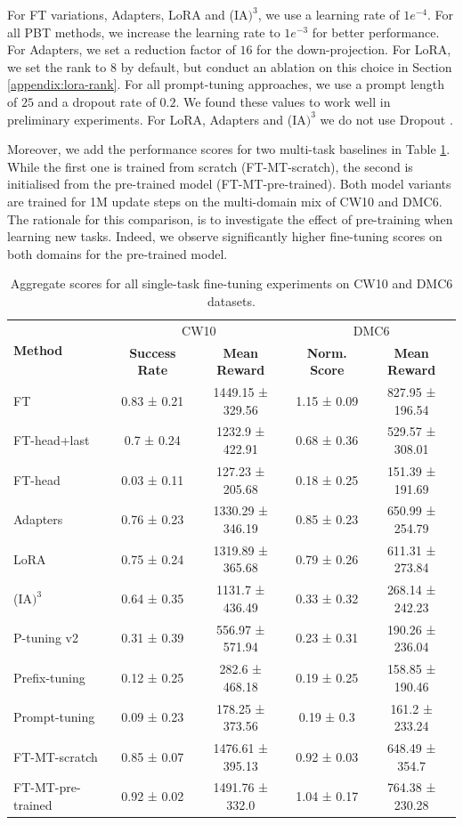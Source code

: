 For FT variations, Adapters, LoRA and (IA$\text{)}^3$, we use a learning rate of $1e^{-4}$. For all PBT methods, we increase the learning rate to $1e^{-3}$ for better performance. For Adapters, we set a reduction factor of $16$ for the down-projection. For LoRA, we set the rank to 8 by default, but conduct an ablation on this choice in Section \ref{appendix:lora-rank}. For all prompt-tuning approaches, we use a prompt length of $25$ and a dropout rate of $0.2$. We found these values to work well in preliminary experiments. For LoRA, Adapters and (IA$\text{)}^3$ we do not use Dropout \citep{Srivastava:14}. 

Moreover, we add the performance scores for two multi-task baselines in Table \ref{tab:appendix-adapt-full}. While the first one is trained from scratch (FT-MT-scratch), the second is initialised from the pre-trained model (FT-MT-pre-trained). Both model variants are trained for 1M update steps on the multi-domain mix of CW10 and DMC6. The rationale for this comparison, is to investigate the effect of pre-training when learning new tasks. Indeed, we observe significantly higher fine-tuning scores on both domains for the pre-trained model.  

\begin{table}[]
    \centering
    \caption{Aggregate scores for all single-task fine-tuning experiments on CW10 and DMC6 datasets.}
    \begin{tabular}{l c c | c c}
    \toprule
    \multirow{2}{*}{\textbf{Method}} & \multicolumn{2}{c}{CW10} & \multicolumn{2}{c}{DMC6} \\
    &  \textbf{Success Rate} &  \textbf{Mean Reward} & \textbf{Norm. Score} & \textbf{Mean Reward} \\
    \midrule
    FT &  0.83 ± 0.21 & 1449.15 ± 329.56 & 1.15 ± 0.09 & 827.95 ± 196.54 \\
    FT-head+last &   0.7 ± 0.24 &  1232.9 ± 422.91 & 0.68 ± 0.36 & 529.57 ± 308.01 \\
    FT-head &  0.03 ± 0.11 &  127.23 ± 205.68 & 0.18 ± 0.25 & 151.39 ± 191.69 \\
    Adapters &  0.76 ± 0.23 & 1330.29 ± 346.19 & 0.85 ± 0.23 & 650.99 ± 254.79 \\
    LoRA &  0.75 ± 0.24 & 1319.89 ± 365.68 & 0.79 ± 0.26 & 611.31 ± 273.84 \\
    (IA$\text{)}^3$ &  0.64 ± 0.35 &  1131.7 ± 436.49 & 0.33 ± 0.32 & 268.14 ± 242.23 \\
    P-tuning v2 &  0.31 ± 0.39 &  556.97 ± 571.94 & 0.23 ± 0.31 & 190.26 ± 236.04 \\
    Prefix-tuning &  0.12 ± 0.25 &   282.6 ± 468.18 & 0.19 ± 0.25 & 158.85 ± 190.46 \\
    Prompt-tuning &  0.09 ± 0.23 &  178.25 ± 373.56 &  0.19 ± 0.3 &  161.2 ± 233.24 \\
    \midrule
    FT-MT-scratch  &  0.85 ± 0.07 & 1476.61 ± 395.13 &  0.92 ± 0.03 & 648.49 ± 354.7 \\
    FT-MT-pre-trained &  0.92 ± 0.02 & 1491.76 ± 332.0 &  1.04 ± 0.17 & 764.38 ± 230.28 \\
    \bottomrule
    \end{tabular}
    \label{tab:appendix-adapt-full}
\end{table}

